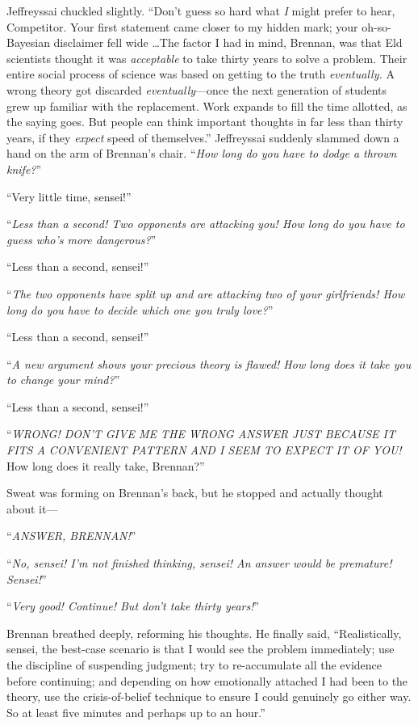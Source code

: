 {
 Jeffreyssai chuckled slightly.
``Don't guess so hard what \textit{I}
might prefer to hear, Competitor. Your first statement came closer to
my hidden mark; your oh-so-Bayesian disclaimer fell wide \ldots The
factor I had in mind, Brennan, was that Eld scientists thought it was
\textit{acceptable} to take thirty years to solve a problem. Their
entire social process of science was based on getting to the truth
\textit{eventually.} A wrong theory got discarded
\textit{eventually}{}---once the next generation of students grew up
familiar with the replacement. Work expands to fill the time allotted,
as the saying goes. But people can think important thoughts in far less
than thirty years, if they \textit{expect} speed of
themselves.'' Jeffreyssai suddenly slammed down a
hand on the arm of Brennan's chair.
``\textit{How long do you have to dodge a thrown
knife?}''}

{
 ``Very little time, sensei!''}

{
 ``\textit{Less than a second! Two opponents are
attacking you! How long do you have to guess who's more
dangerous?}''}

{
 ``Less than a second,
sensei!''}

{
 ``\textit{The two opponents have split up and are
attacking two of your girlfriends! How long do you have to decide which
one you truly love?}''}

{
 ``Less than a second,
sensei!''}

{
 ``\textit{A new argument shows your precious
theory is flawed! How long does it take you to change your
mind?}''}

{
 ``Less than a second,
sensei!''}

{
 ``\textit{WRONG! DON'T GIVE ME
THE WRONG ANSWER JUST BECAUSE IT FITS A CONVENIENT PATTERN AND I SEEM
TO EXPECT IT OF YOU!} How long does it really take,
Brennan?''}

{
 Sweat was forming on Brennan's back, but he
stopped and actually thought about it---}

{
 ``\textit{ANSWER, BRENNAN!}''}

{
 ``\textit{No, sensei! I'm not
finished thinking, sensei! An answer would be premature!
Sensei!}''}

{
 ``\textit{Very good! Continue! But
don't take thirty years!}''}

{
 Brennan breathed deeply, reforming his thoughts. He finally said,
``Realistically, sensei, the best-case scenario is
that I would see the problem immediately; use the discipline of
suspending judgment; try to re-accumulate all the evidence before
continuing; and depending on how emotionally attached I had been to the
theory, use the crisis-of-belief technique to ensure I could genuinely
go either way. So at least five minutes and perhaps up to an
hour.''}

